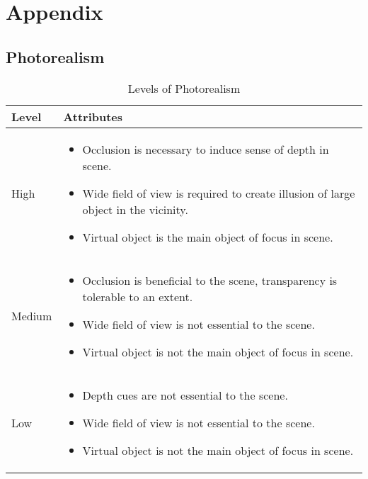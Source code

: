 \chapter{Appendix}

\section{Photorealism}
\begin{table}[h]
	\centering
	\begin{tabular}{L{1.5cm}L{9cm}@{}}
		\toprule
		\textbf{Level} & \textbf{Attributes} \\ 
		\midrule
		High & \vspace{-11pt} \begin{itemize}[leftmargin=*,topsep=0pt,align=left,itemsep=0.5pt,after=]
			\renewcommand{\labelitemi}{\scalebox{.9}{\tiny\listsymb}}
			\item Occlusion is necessary to induce sense of depth in scene.
			\item Wide field of view is required to create illusion of large object in the vicinity.	
			\item Virtual object is the main object of focus in scene. 
		\end{itemize}\\
		\hline
		Medium & \vspace{-11pt} \begin{itemize}[leftmargin=*,topsep=0pt,align=left,itemsep=0.25pt,after=]
			\renewcommand{\labelitemi}{\scalebox{.9}{\tiny\listsymb}}
			\item Occlusion is beneficial to the scene, transparency is tolerable to an extent.
			\item Wide field of view is not essential to the scene. 
			\item Virtual object is not the main object of focus in scene.
		\end{itemize}\\
		\hline
		Low & \vspace{-11pt} \begin{itemize}[leftmargin=*,topsep=0pt,align=left,itemsep=0.25pt,after=]
			\renewcommand{\labelitemi}{\scalebox{.9}{\tiny\listsymb}}
			\item Depth cues are not essential to the scene.
			\item Wide field of view is not essential to the scene.
			\item Virtual object is not the main object of focus in scene.
		\end{itemize}\\
		\bottomrule
	\end{tabular}
	\caption{Levels of Photorealism}
	\label{tab:trainingoptions}
\end{table}

